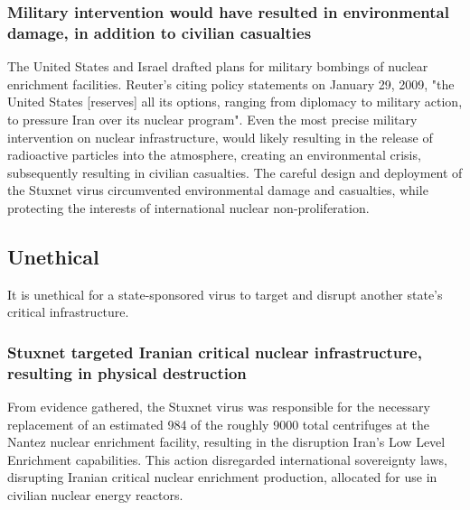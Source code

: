 \documentclass[12pt]{article}
\begin{document}
\begin{multicols}{2}
\subsubsection{Military intervention would have resulted in environmental damage, in addition to civilian casualties}

The United States and Israel drafted plans for military bombings of nuclear enrichment facilities. Reuter's citing policy statements on January 29, 2009, "the United States [reserves] all its options, ranging from diplomacy to military action, to pressure Iran over its nuclear program".\cite{usOptionsForIran} Even the most precise military intervention on nuclear infrastructure, would likely resulting in the release of radioactive particles into the atmosphere, creating an environmental crisis, subsequently resulting in civilian casualties. The careful design and deployment of the Stuxnet virus circumvented environmental damage and casualties, while protecting the interests of international nuclear non-proliferation.

\subsection{Unethical}

It is unethical for a state-sponsored virus to target and disrupt another state's critical infrastructure.

\subsubsection{Stuxnet targeted Iranian critical nuclear infrastructure, resulting in physical destruction}

From evidence gathered, the Stuxnet virus was responsible for the necessary replacement of an estimated 984 of the roughly 9000 total centrifuges at the Nantez nuclear enrichment facility, resulting in the disruption Iran's Low Level Enrichment capabilities.\cite{lookIntoIranianNuclearProgram} This action disregarded international sovereignty laws, disrupting Iranian critical nuclear enrichment production, allocated for use in civilian nuclear energy reactors.\cite{internationalSovereigntyDefinition}\footnotemark[2] 



\end{multicols}
\end{document}
